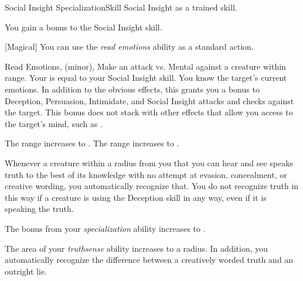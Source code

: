     \begin{feat}{Social Insight Specialization}{Skill}
        \featpre Social Insight as a trained skill.

         You gain a  bonus to the Social Insight skill.

        [Magical] You can use the \textit{read emotions} ability as a standard action.
        \begin{sustainability}{Read Emotions}{,  (minor), }
            \rankline
            Make an attack vs. Mental against a creature within \rngshort range.
            Your  is equal to your Social Insight skill.
            \hit You know the target's current emotions.
            In addition to the obvious effects, this grants you a  bonus to Deception, Persuasion, Intimidate, and Social Insight attacks and checks against the target.
            This bonus does not stack with other effects that allow you access to the target's mind, such as .

            \rankline
             The range increases to \medrange.
             The range increases to \longrange.
        \end{sustainability}

         Whenever a creature within a \arealarge radius  from you that you can hear and see speaks truth to the best of its knowledge with no attempt at evasion, concealment, or creative wording, you automatically recognize that.
        You do not recognize truth in this way if a creature is using the Deception skill in any way, even if it is speaking the truth.

         The bonus from your \textit{specialization} ability increases to .

         The area of your \textit{truthsense} ability increases to a \gargarea radius.
        In addition, you automatically recognize the difference between a creatively worded truth and an outright lie.
    \end{feat}

